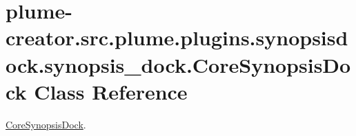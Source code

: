 \hypertarget{classplume-creator_1_1src_1_1plume_1_1plugins_1_1synopsisdock_1_1synopsis__dock_1_1_core_synopsis_dock}{}\section{plume-\/creator.src.\+plume.\+plugins.\+synopsisdock.\+synopsis\+\_\+dock.\+Core\+Synopsis\+Dock Class Reference}
\label{classplume-creator_1_1src_1_1plume_1_1plugins_1_1synopsisdock_1_1synopsis__dock_1_1_core_synopsis_dock}


\hyperlink{classplume-creator_1_1src_1_1plume_1_1plugins_1_1synopsisdock_1_1synopsis__dock_1_1_core_synopsis_dock}{Core\+Synopsis\+Dock}.  


